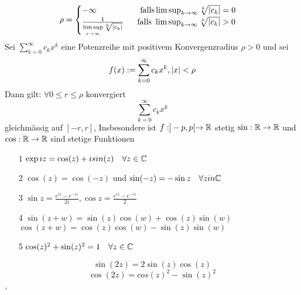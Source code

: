 \[\rho = \begin{cases}
    -\infty \quad \quad \quad \quad \quad \  \text{falls} \limsup_{k \rightarrow \infty} \sqrt[k]{\left\lvert c_k \right\rvert} = 0 \\
    \frac{1}{\limsup\limits_{c \rightarrow \infty} \sqrt[k]{\left|c_{k}\right|}}  \quad \  \ \text{falls } \limsup_{k \rightarrow \infty} \sqrt[k]{\left\lvert c_k \right\rvert} > 0
    \end{cases}\]
\newline
{} Sei \(\sum_{k=0}^\infty c_kx^k \) eine Potenzreihe mit positivem Konvergenzradius \(\rho > 0\) und sei 
\[f(x) := \sum_{k=0}^\infty c_kx^k, \left\lvert x \right\rvert < \rho \]
Dann gilt: \(\forall 0 \leq r \leq \rho \) konvergiert
\[\sum_{k=0}^\infty c_kx^k \]
gleichmässig auf \([-r,r]\), Insbesondere ist \(f: ] -p,p[ \rightarrow \mathbb{R}\) stetig
 \( \sin: \mathbb{R} \rightarrow \mathbb{R} \) und \(\cos: \mathbb{R} \rightarrow \mathbb{R} \) sind stetige Funktionen
\begin{enumerate}
    \item [1] \( \exp iz = \cos(z) + i sin(z) \quad \forall z \in \mathbb{C} \)
    \item [2] \( \cos(z) = \cos(-z)\) und \(\sin(-z) = -\sin z \quad \forall z in \mathbb{C} \)
    \item [3] \( \sin z = \frac{e^{iz} - e^{-iz}}{2i}, \cos z = \frac{e^{iz} - e^{-iz}}{2}\)
    \item [4] \( \sin(z + w) = \sin(z) \cos(w) + \cos(z) \sin(w)\) \newline
    \( \cos(z + w) = \cos(z) \cos(w) - \sin(z) \sin(w) \)
    \item [5] \( \cos(z)^2 + \sin(z)^2 = 1 \quad \forall z \in \mathbb{C} \)
\end{enumerate}
\[\sin(2z) = 2 \sin(z) \cos(z)\]
\[\cos(2z) = cos(z)^2 - \sin(z)^2\]
\sep
